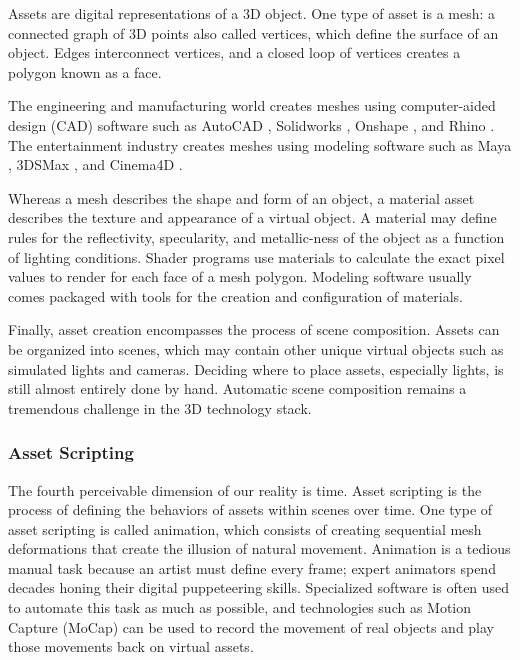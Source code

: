 \documentclass{article}
\begin{document}
Assets are digital representations of a 3D object. One type of asset is a mesh: a connected graph of 3D points also called vertices, which define the surface of an object. Edges interconnect vertices, and a closed loop of vertices creates a polygon known as a face.

The engineering and manufacturing world creates meshes using computer-aided design (CAD) software such as AutoCAD \cite{autocad}, Solidworks \cite{solidworks}, Onshape \cite{onshape}, and Rhino \cite{rhino}. The entertainment industry creates meshes using modeling software such as Maya \cite{maya}, 3DSMax \cite{3dsmax}, and Cinema4D \cite{cinema4d}.

Whereas a mesh describes the shape and form of an object, a material asset describes the texture and appearance of a virtual object. A material may define rules for the reflectivity, specularity, and metallic-ness of the object as a function of lighting conditions. Shader programs use materials to calculate the exact pixel values to render for each face of a mesh polygon. Modeling software usually comes packaged with tools for the creation and configuration of materials.

Finally, asset creation encompasses the process of scene composition. Assets can be organized into scenes, which may contain other unique virtual objects such as simulated lights and cameras. Deciding where to place assets, especially lights, is still almost entirely done by hand. Automatic scene composition remains a tremendous challenge in the 3D technology stack.

\subsubsection{Asset Scripting}
\label{sec:assetscripting}

The fourth perceivable dimension of our reality is time. Asset scripting is the process of defining the behaviors of assets within scenes over time. One type of asset scripting is called animation, which consists of creating sequential mesh deformations that create the illusion of natural movement. Animation is a tedious manual task because an artist must define every frame; expert animators spend decades honing their digital puppeteering skills. Specialized software is often used to automate this task as much as possible, and technologies such as Motion Capture (MoCap) can be used to record the movement of real objects and play those movements back on virtual assets.
\end{document}
